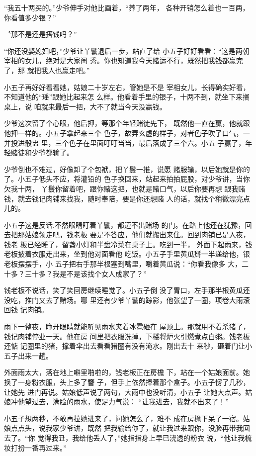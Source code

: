 “我五十两买的。”少爷伸手对他比画着，“养了两年，
各种开销怎么着也一百两，你看值多少银？”

〝那不是还是搭钱吗？”

“你还没娶媳妇吧，”少爷让丫鬟退后一步，站直了给
小五子好好看看：“这是两朝宰相的女儿，绝对是大家闺
秀。你也知道我今天赌运不行，既然把我钱都赢完了，那
就把我人也赢走吧。”

小五子再好好看看她，姑娘二十岁左右，管她是不是
宰相女儿，长得确实好看，不知道他的“瑶”跟她比起来怎
么样。他看着手里的银子，十两不到，就坐下来搁桌上，说
咱就来最后一把，大不了就当今天没赢钱。

少爷这次留了个心眼，他后押，等那个年轻赌徒先下，
既然他一直在赢，他就跟他押一样的。小五子拿起来三个
色子，故弄玄虚的样子，对者色子吹了口气，一并投进骰盅
里，三个色子在里面叮叮当当，最后落成了三个六。小五
子赢了，年轻赌徒和少爷都输了。

少爷倒也不难过，好像卸了个包袱，把丫鬟一推，说愿
赌服输，以后她就是你的了。小五子低头不应，将灌铅的
色子换回来，站起来拍拍屁股，对少爷讲，当你欠我十两，
丫鬟你留着吧，跟你赌这把，也就是赌口气，以后你要再想
跟我赌钱，就去钱记肉铺来找我，随时奉陪，要是你还想赌
人的话，就找个稍微漂亮点儿的。

小五子这是反话.不然眼睛盯着丫鬟，都迈不出赌场
的门。在路上他还在犹豫，回去把那姑娘领走吧，钱老板
要是不答应，他们就搬出来住。回到肉铺已是入夜，钱老
板已经睡了，留盏小灯和半盘冷菜在桌子上。吃到一半，
外面下起雨来，钱老板披着衣服走出来，坐到他对面看他
吃饭。小五子手里黄瓜掰一半递给他，银老板摆摆手，小
五子把右手那半根塞到嘴里，嚼着黄瓜说：“你看我像多
大，二十多？三十多？我是不是该找个女人成家了？”

钱老板不说话，笑了笑回房继续睡觉了。小五子倒
没了胃口，左手那半根黄瓜还没吃，推门又去了赌场。哪
里还有少爷丫鬟的踪影，他张望了一圈，项卷大雨滚回钱
记肉铺。

雨下一整夜，睁开眼睛就能听见雨水夹着冰雹砸在
屋顶上。那就用不着杀猪了，钱记肉铺停业一天。他在房
间里把衣服洗掉，下楼将炉火引燃煮点白粥。饯老板还惦
记圈里的猪，撑着伞出去看看猪圈有没有淹水。刚出去十
来秒，砸着门让小五子出来一趟。

外面雨太大，落在地上噼里啪啦的，钱老板正在房檐
下，站在一个姑娘面前。她换了一身粉衣服，头上多了簪
子，但手上依然捧着那个盒子。小五子愣了几秒，让她先
进门再说。姑娘低声说了两句，大雨中也没听清，小五子
让她大点声。姑娘冲他望过去，满脸的雨水，使足力气说：
“让我进去，我就不出来了！”

小五子想两秒，不敢再拉她进来了，问她怎么了，难不
成在房檐下呆了一宿。姑娘点点头，说我家少爷讲，既然
把我输给你了，就让我过来跟你，没脸再带我回去了。“你
觉得我丑，我给他丢人了，”她指指身上早已浇透的粉衣
说，“他让我梳妆打扮一番再过来。”

